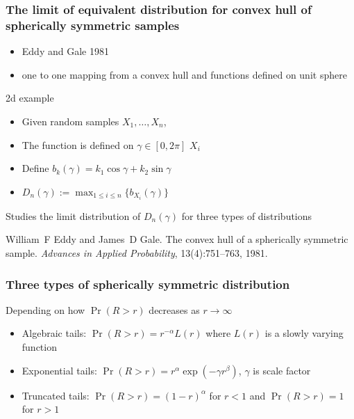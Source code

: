 \documentclass{beamer}
\begin{document}
\begin{frame}
    \frametitle{The limit of equivalent distribution for convex hull of spherically symmetric samples}
    \begin{itemize}
        \item Eddy and Gale 1981
        \item one to one mapping from a convex hull and functions defined on unit sphere
    \end{itemize}
    \begin{block}{2d example}
        \begin{itemize}
        \item Given random samples $X_1, \dots, X_n$,
        \item The function is defined on $\gamma \in [0,2\pi]$
        $X_i$
        \item Define $b_k(\gamma) =  k_1\cos\gamma + k_2 \sin \gamma$
        \item $D_n(\gamma):=\max_{1\leq i \leq n}\{b_{X_i}(\gamma)\}$
        \end{itemize}
    \end{block}
    Studies the limit distribution of $D_n(\gamma)$ for three types of distributions

    \footnotesize{William~F Eddy and James~D Gale.
     The convex hull of a spherically symmetric sample.
    {\em Advances in Applied Probability}, 13(4):751--763, 1981.
    }
\end{frame}
\begin{frame}
    \frametitle{Three types of spherically symmetric distribution}
    Depending on how $\Pr(R>r)$ decreases as $r\to \infty$
    \begin{itemize}
        \item Algebraic tails: $\Pr(R>r) = r^{-\alpha} L(r)$ where $L(r)$ is a slowly varying function
        \item Exponential tails: $\Pr(R>r) = r^{\alpha} \exp(-\gamma r^{\beta})$, $\gamma$ is scale factor
        \item Truncated tails: $\Pr(R>r) = (1-r)^{\alpha}$ for $r<1$ and $\Pr(R>r)=1$ for $r>1$
    \end{itemize}
\end{frame}
\end{document}
